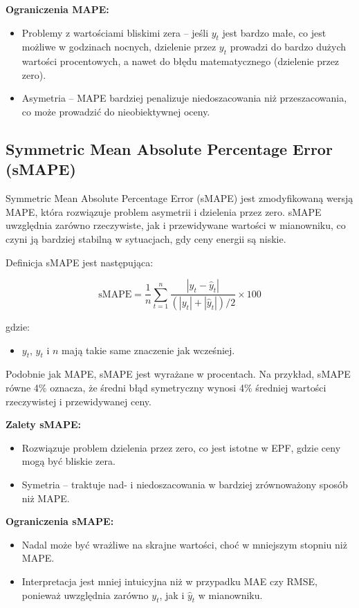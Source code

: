 \textbf{Ograniczenia MAPE:}
\begin{itemize}
    \item Problemy z wartościami bliskimi zera -- jeśli \( y_t \) jest bardzo małe, co jest możliwe w godzinach nocnych, dzielenie przez \( y_t \) prowadzi do bardzo dużych wartości procentowych, a nawet do błędu matematycznego (dzielenie przez zero).
    \item Asymetria -- MAPE bardziej penalizuje niedoszacowania niż przeszacowania, co może prowadzić do nieobiektywnej oceny.
\end{itemize}

\subsection{Symmetric Mean Absolute Percentage Error (sMAPE)}
\label{subsec:smape}

Symmetric Mean Absolute Percentage Error (sMAPE) jest zmodyfikowaną wersją MAPE, która rozwiązuje problem asymetrii i dzielenia przez zero. sMAPE uwzględnia zarówno rzeczywiste, jak i przewidywane wartości w mianowniku, co czyni ją bardziej stabilną w sytuacjach, gdy ceny energii są niskie.

Definicja sMAPE jest następująca:

\[
\text{sMAPE} = \frac{1}{n} \sum_{t=1}^{n} \frac{\left| y_t - \hat{y}_t \right|}{\left( \left| y_t \right| + \left| \hat{y}_t \right| \right) / 2} \times 100
\]

gdzie:
\begin{itemize}
    \item \( y_t \), \( \hat{y}_t \) i \( n \) mają takie same znaczenie jak wcześniej.
\end{itemize}

Podobnie jak MAPE, sMAPE jest wyrażane w procentach. Na przykład, sMAPE równe 4\% oznacza, że średni błąd symetryczny wynosi 4\% średniej wartości rzeczywistej i przewidywanej ceny.

\textbf{Zalety sMAPE:}
\begin{itemize}
    \item Rozwiązuje problem dzielenia przez zero, co jest istotne w EPF, gdzie ceny mogą być bliskie zera.
    \item Symetria -- traktuje nad- i niedoszacowania w bardziej zrównoważony sposób niż MAPE.
\end{itemize}

\textbf{Ograniczenia sMAPE:}
\begin{itemize}
    \item Nadal może być wrażliwe na skrajne wartości, choć w mniejszym stopniu niż MAPE.
    \item Interpretacja jest mniej intuicyjna niż w przypadku MAE czy RMSE, ponieważ uwzględnia zarówno \( y_t \), jak i \( \hat{y}_t \) w mianowniku.
\end{itemize}

